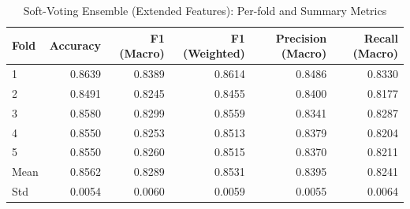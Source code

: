 \begin{table}
\caption{Soft-Voting Ensemble (Extended Features): Per-fold and Summary Metrics}
\label{tab:ensemble_ext_per_fold}
\begin{tabular}{lrrrrr}
\toprule
Fold & Accuracy & F1 (Macro) & F1 (Weighted) & Precision (Macro) & Recall (Macro) \\
\midrule
1 & 0.8639 & 0.8389 & 0.8614 & 0.8486 & 0.8330 \\
2 & 0.8491 & 0.8245 & 0.8455 & 0.8400 & 0.8177 \\
3 & 0.8580 & 0.8299 & 0.8559 & 0.8341 & 0.8287 \\
4 & 0.8550 & 0.8253 & 0.8513 & 0.8379 & 0.8204 \\
5 & 0.8550 & 0.8260 & 0.8515 & 0.8370 & 0.8211 \\
Mean & 0.8562 & 0.8289 & 0.8531 & 0.8395 & 0.8241 \\
Std & 0.0054 & 0.0060 & 0.0059 & 0.0055 & 0.0064 \\
\bottomrule
\end{tabular}
\end{table}
